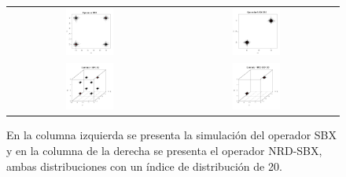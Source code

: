 \begin{figure}
\centering
\begin{tabular}{cc}
   \includegraphics[width=0.3\textwidth]{Figures_Chapter6/SBX_2D_Index_20.png} &
   \includegraphics[width=0.3\textwidth]{Figures_Chapter6/DSBX_2D_Index_20.png} \\   
   \includegraphics[width=0.3\textwidth]{Figures_Chapter6/SBX_3D_Index_20.png} &
   \includegraphics[width=0.3\textwidth]{Figures_Chapter6/DSBX_3D_Index_20.png}  
\end{tabular}
\caption{En la columna izquierda se presenta la simulación del operador  SBX y en la columna de la derecha se presenta el operador NRD-SBX, ambas distribuciones con un índice de distribución de 20.}
\label{fig:Simulations_Index_20}
\end{figure}

